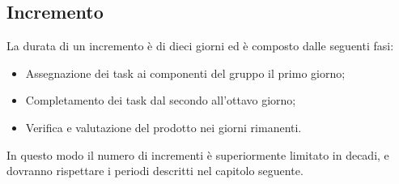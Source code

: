 \subsection{Incremento}
\label{inc}

La durata di un incremento è di dieci giorni ed è composto dalle seguenti fasi:
\begin{itemize}
	\item Assegnazione dei task ai componenti del gruppo il primo giorno;
	\item Completamento dei task dal secondo all'ottavo giorno;
	\item Verifica e valutazione del prodotto nei giorni rimanenti.
\end{itemize}

In questo modo il numero di incrementi è superiormente limitato in decadi, e dovranno rispettare i periodi descritti nel capitolo seguente.  